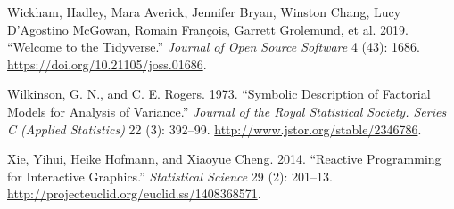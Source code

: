 \begin{CSLReferences}{1}{0}
\leavevmode{}%
Wickham, Hadley, Mara Averick, Jennifer Bryan, Winston Chang, Lucy D'Agostino McGowan, Romain François, Garrett Grolemund, et al. 2019. {``Welcome to the Tidyverse.''} \emph{Journal of Open Source Software} 4 (43): 1686. \url{https://doi.org/10.21105/joss.01686}.

\leavevmode{}%
Wilkinson, G. N., and C. E. Rogers. 1973. {``Symbolic Description of Factorial Models for Analysis of Variance.''} \emph{Journal of the Royal Statistical Society. Series C (Applied Statistics)} 22 (3): 392--99. \url{http://www.jstor.org/stable/2346786}.

\leavevmode{}%
Xie, Yihui, Heike Hofmann, and Xiaoyue Cheng. 2014. {``Reactive Programming for Interactive Graphics.''} \emph{Statistical Science} 29 (2): 201--13. \url{http://projecteuclid.org/euclid.ss/1408368571}.

\end{CSLReferences}



\address{%
Earo Wang\\
The University of Auckland\\%
Department of Statistics\\
%
%
\textit{ORCiD: \href{https://orcid.org/0000-0001-6448-5260}{0000-0001-6448-5260}}\\%
\href{mailto:earo.wang@auckland.ac.nz}{\nolinkurl{earo.wang@auckland.ac.nz}}%
}

\address{%
Dianne Cook\\
Monash University\\%
Department of Econometrics and Business Statistics\\
%
%
\textit{ORCiD: \href{https://orcid.org/0000-0002-3813-7155}{0000-0002-3813-7155}}\\%
\href{mailto:dicook@monash.edu}{\nolinkurl{dicook@monash.edu}}%
}
